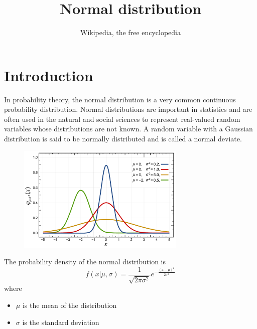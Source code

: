 \documentclass[12pt,a4paper]{article}
\title{Normal distribution}
\author{Wikipedia, the free encyclopedia}
\begin{document}
\maketitle
\section{Introduction}
In probability theory, the normal distribution is a very common continuous probability
distribution. Normal distributions are important in statistics and are often used in the natural
and social sciences to represent real-valued random variables whose distributions are not known.
A random variable with a Gaussian distribution is said to be normally distributed and is called a
normal deviate.

\begin{figure}[h]
  \centering
  \includegraphics[width=8cm]{normal-distribution-PDF.pdf}
\end{figure}

The probability density of the normal distribution is
\begin{equation}
  f(x|\mu,\sigma)
  = \frac{1}{\sqrt{2\pi\sigma^2}}
    e^{-\frac{(x-\mu)^2}{2\sigma^2}}
\end{equation}
where
\begin{itemize}
  \item $\mu$ is the mean of the distribution
  \item $\sigma$ is the standard deviation
\end{itemize}
\end{document}
